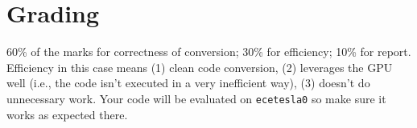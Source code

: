\documentclass[letterpaper,10pt]{article}
\begin{document}
\section*{Grading}
60\% of the marks for correctness of conversion; 30\% for efficiency; 10\% for report. Efficiency in this case means (1) clean code conversion, (2) leverages the GPU well (i.e., the code isn't executed in a very inefficient way), (3) doesn't do unnecessary work. Your code will be evaluated on \texttt{ecetesla0} so make sure it
works as expected there. 
\end{document}
